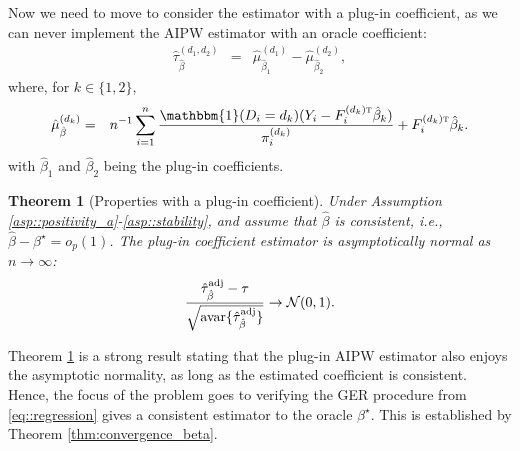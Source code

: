 \documentclass{article}
\theoremstyle{plain}
\newtheorem{theorem}{Theorem}[section]
\theoremstyle{definition}
\theoremstyle{remark}
\def\T{{\textsc{t}}}
\newcommand{\var}{\textup{var}}
\newcommand{\avar}{\textup{avar}}
\newcommand{\bY}{\boldsymbol{Y}}
\newcommand{\bX}{\boldsymbol{X}}
\newcommand{\bLambda}{\boldsymbol{\Lambda}}
\newcommand{\bPhi}{\boldsymbol{\Phi}}
\newcommand{\cN}{\mathcal{N}}
\newcommand{\indicator}{\mathbbm{1}}
\newcommand{\sumi}{\sum_{i=1}^n}
\begin{document}
Now we need to move to consider the estimator with a plug-in coefficient, as we can never implement the AIPW estimator with an oracle coefficient:
\begin{eqnarray*}
    \hat\tau{}^{(d_1, d_2)}_{\hat\beta} &=& \hat\mu{}^{(d_1)}_{\hat\beta_1} - \hat\mu{}^{(d_2)}_{\hat\beta_2},
\end{eqnarray*}
where, for $k \in \{1,2\}$,
\begin{eqnarray*}
    \hat\mu^{(d_k)}_{\hat\beta} &=& n^{-1}\sumi\frac{\indicator(D_i=d_k)(Y_i-F_i^{(d_k)\T} \hat\beta_k)}{\pi_i^{(d_k)}} + F_i^{(d_k)\T} \hat\beta_k.
\end{eqnarray*}
with $\hat\beta_1$ and $\hat\beta_2$ being the plug-in coefficients.  
\begin{theorem}[Properties with a plug-in coefficient]\label{thm:plug_in}
    Under Assumption \ref{asp::positivity_a}-\ref{asp::stability}, and assume that $\hat\beta$ is consistent, i.e., $\hat\beta - \beta^\star = o_p(1)$. The plug-in coefficient estimator is asymptotically normal as $n\to\infty$:
    \begin{eqnarray*}
        \frac{\hat\tau^{\textup{adj}}_{\hat{\beta}} - \tau}{\sqrt{\avar\{\hat\tau^{\textup{adj}}_{\hat\beta}\}}} \rightarrow \cN(0, 1).
    \end{eqnarray*}
\end{theorem}
Theorem \ref{thm:plug_in} is a strong result stating that the plug-in AIPW estimator also enjoys the asymptotic normality, as long as the estimated coefficient is consistent. Hence, the focus of the problem goes to verifying the GER procedure from \eqref{eq::regression} gives a consistent estimator to the oracle $\beta^\star$. This is established by Theorem \ref{thm:convergence_beta}. 


  

\end{document}
